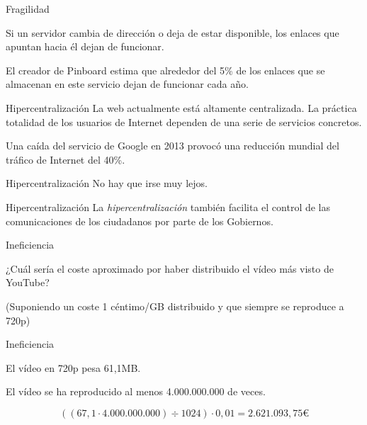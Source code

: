 \documentclass[spanish]{beamer}
\begin{document}
\begin{frame}{Fragilidad}

  Si un servidor cambia de dirección o deja de estar disponible, los enlaces que apuntan hacia él dejan de funcionar.

  El creador de Pinboard estima que alrededor del 5\% de los enlaces que se almacenan en este servicio dejan de funcionar cada año.

\end{frame}

\begin{frame}{Hipercentralización}
  La web actualmente está altamente centralizada. La práctica totalidad de los usuarios de Internet dependen de una serie de servicios concretos.

  Una caída del servicio de Google en 2013 provocó una reducción mundial del tráfico de Internet del 40\%.
\end{frame}

\begin{frame}{Hipercentralización}
  No hay que irse muy lejos.
\end{frame}

\begin{frame}{Hipercentralización}
  La \textit{hipercentralización} también facilita el control de las comunicaciones de los ciudadanos por parte de los Gobiernos.
\end{frame}

\begin{frame}{Ineficiencia}
  
  ¿Cuál sería el coste aproximado por haber distribuido el vídeo más visto de YouTube?

  (Suponiendo un coste 1 céntimo/GB distribuido y que siempre se reproduce a 720p)

\end{frame}

\begin{frame}{Ineficiencia}
  
  El vídeo en 720p pesa 61,1MB.

  El vídeo se ha reproducido al menos 4.000.000.000 de veces.

  \begin{equation*}
    ((67,1 \cdot 4.000.000.000) \div 1024) \cdot 0,01 = 2\text{.}621\text{.}093,75 \text{€}
  \end{equation*}

\end{frame}

\end{document}
